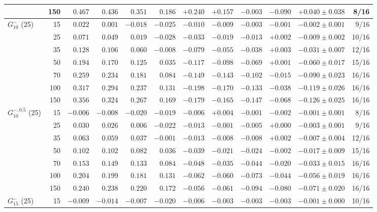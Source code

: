\begin{tabular}{lrrrrrrrrrrr}
 & 150 & $0.467$ & $0.436$ & $0.351$ & $0.186$ & $+0.240$ & $+0.157$ & $-0.003$ & $-0.090$ & $+0.040 \pm 0.038$ & 8/16 \\
\midrule
$G_{10}^{-}$ (25) & 15 & $0.022$ & $0.001$ & $-0.018$ & $-0.025$ & $-0.010$ & $-0.009$ & $-0.003$ & $-0.001$ & $-0.002 \pm 0.001$ & 9/16 \\
 & 25 & $0.071$ & $0.049$ & $0.019$ & $-0.028$ & $-0.033$ & $-0.019$ & $-0.013$ & $+0.002$ & $-0.009 \pm 0.002$ & 10/16 \\
 & 35 & $0.128$ & $0.106$ & $0.060$ & $-0.008$ & $-0.079$ & $-0.055$ & $-0.038$ & $+0.003$ & $-0.031 \pm 0.007$ & 12/16 \\
 & 50 & $0.194$ & $0.170$ & $0.125$ & $0.035$ & $-0.117$ & $-0.098$ & $-0.069$ & $+0.001$ & $-0.060 \pm 0.017$ & 15/16 \\
 & 70 & $0.259$ & $0.234$ & $0.181$ & $0.084$ & $-0.149$ & $-0.143$ & $-0.102$ & $-0.015$ & $-0.090 \pm 0.023$ & 16/16 \\
 & 100 & $0.317$ & $0.294$ & $0.237$ & $0.131$ & $-0.198$ & $-0.170$ & $-0.133$ & $-0.038$ & $-0.119 \pm 0.026$ & 16/16 \\
 & 150 & $0.356$ & $0.324$ & $0.267$ & $0.169$ & $-0.179$ & $-0.165$ & $-0.147$ & $-0.068$ & $-0.126 \pm 0.025$ & 16/16 \\
\midrule
$G_{10}^{-,0.5}$ (25) & 15 & $-0.006$ & $-0.008$ & $-0.020$ & $-0.019$ & $-0.006$ & $+0.004$ & $-0.001$ & $-0.002$ & $-0.001 \pm 0.001$ & 8/16 \\
 & 25 & $0.030$ & $0.026$ & $0.006$ & $-0.022$ & $-0.013$ & $-0.001$ & $-0.005$ & $+0.000$ & $-0.003 \pm 0.001$ & 9/16 \\
 & 35 & $0.063$ & $0.059$ & $0.037$ & $-0.001$ & $-0.013$ & $-0.008$ & $-0.008$ & $+0.002$ & $-0.007 \pm 0.004$ & 12/16 \\
 & 50 & $0.102$ & $0.102$ & $0.082$ & $0.036$ & $-0.039$ & $-0.021$ & $-0.024$ & $-0.002$ & $-0.017 \pm 0.009$ & 15/16 \\
 & 70 & $0.153$ & $0.149$ & $0.133$ & $0.084$ & $-0.048$ & $-0.035$ & $-0.044$ & $-0.020$ & $-0.033 \pm 0.015$ & 16/16 \\
 & 100 & $0.204$ & $0.199$ & $0.181$ & $0.131$ & $-0.062$ & $-0.060$ & $-0.073$ & $-0.044$ & $-0.056 \pm 0.019$ & 16/16 \\
 & 150 & $0.240$ & $0.238$ & $0.220$ & $0.172$ & $-0.056$ & $-0.061$ & $-0.094$ & $-0.080$ & $-0.071 \pm 0.020$ & 16/16 \\
\midrule
$G_{15}^{-}$ (25) & 15 & $-0.009$ & $-0.014$ & $-0.007$ & $-0.020$ & $-0.006$ & $-0.003$ & $-0.003$ & $-0.003$ & $-0.001 \pm 0.000$ & 10/16 \\

\end{tabular}
